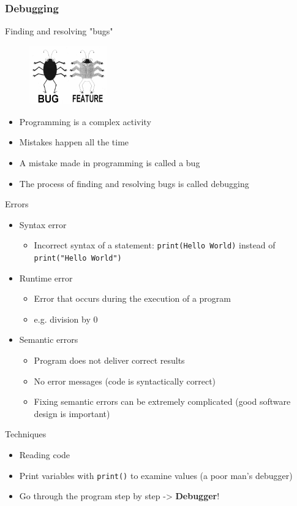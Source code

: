 \documentclass[10pt, a4paper]{beamer} %
\begin{document}
\begin{frame}[c,allowframebreaks]\frametitle{Debugging}
\begin{block}{Finding and resolving "bugs"}
\begin{figure}
  \centering
  \includegraphics[width=0.3\textwidth]{pics/bugvsfeature.jpg}
\end{figure}
\begin{itemize}
\item Programming is a complex activity
\item Mistakes happen all the time
\item A mistake made in programming is called a bug
\item The process of finding and resolving bugs is called debugging
\end{itemize}
\end{block}

\begin{block}{Errors}
  \begin{itemize}
    \item Syntax error
    \begin{itemize}
      \item Incorrect syntax of a statement: \lstinline!print(Hello World)! instead of \lstinline!print("Hello World")!
    \end{itemize}
    \item Runtime error
  
  \begin{itemize}
    \item Error that occurs during the execution of a program
    \item e.g. division by 0
  \end{itemize}
    \item Semantic errors
    \begin{itemize}
      \item Program does not deliver correct results
      \item No error messages (code is syntactically correct)
      \item Fixing semantic errors can be extremely complicated (good software design is important)
    \end{itemize}
  \end{itemize}
\end{block}
\framebreak
\begin{block}{Techniques}
\begin{itemize}
    \item Reading code
    \item Print variables with \lstinline!print()! to examine values (a poor man's debugger)
    \item Go through the program step by step -> \textbf{Debugger}!
  \end{itemize}  
\end{block}
  



\end{frame}
\end{document}
